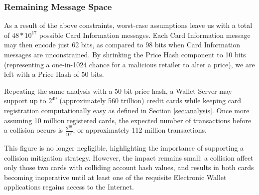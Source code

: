 \subsubsection*{Remaining Message Space}

As a result of the above constraints, worst-case assumptions leave us with a total of $48 * 10^{17}$ possible Card Information messages.
Each Card Information message may then encode just 62 bits, as compared to 98 bits when Card Information messages are unconstrained.
By shrinking the Price Hash component to 10 bits (representing a one-in-1024 chance for a malicious retailer to alter a price),
  we are left with a Price Hash of 50 bits.

Repeating the same analysis with a 50-bit price hash, a Wallet Server may support up to $2^49$ (approximately 560 trillion) credit cards
  while keeping card registration computationally easy as defined in Section \ref{sec:analysis}.
Once more assuming 10 million registered cards, the expected number of transactions before a collision occurs is $\frac{2^{50}}{10^8}$,
  or approximately 112 million transactions.

This figure is no longer negligible, highlighting the importance of supporting a collision mitigation strategy.
However, the impact remains small:
  a collision affect only those two cards with colliding account hash values,
  and results in both cards becoming inoperative until at least one of the requisite Electronic Wallet applications regains access to the Internet.
